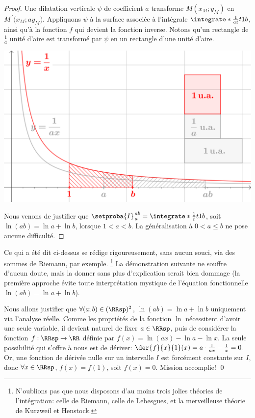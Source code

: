 \begin{proof}
    Une dilatation verticale $\psi$ de coefficient $a$ transforme $M(x_M ; y_M)$ en $M^{\,\prime}\big( x_M ; a y_M)$.
    Appliquons $\psi$ à la surface associée à l'intégrale $\integrate*{\frac{1}{at}}{t}{1}{b}$, ainsi qu'à la fonction $f$ qui devient la fonction inverse. Notons qu'un rectangle de $\frac1a$ unité d'aire est transformé par $\psi$ en un rectangle d'une unité d'aire.

    \begin{center}
        \includegraphics[scale=.5]{content/ln/func-eq-3.png}
    \end{center}

    Nous venons de justifier que
    $\setproba{I}_{\,a}^{\,ab} = \integrate*{\frac{1}{t}}{t}{1}{b}$,
    soit
    $\ln(a b) = \ln a + \ln b$,
    lorsque $1 < a < b$.
    La généralisation à $0 < a \leq b$ ne pose aucune difficulté.
\end{proof}


\begin{remark}
    Ce qui a été dit ci-dessus se rédige rigoureusement, sans aucun souci, via des sommes de Riemann, par exemple.%
    \footnote{
        N'oublions pas que nous disposons d'au moins trois jolies théories de l'intégration:
        celle de Riemann,
        celle de Lebesgues,
        et
        la merveilleuse théorie de Kurzweil et Henstock.
    }
    La démonstration suivante ne souffre d'aucun doute, mais la donner sans plus d'explication serait bien dommage (la première approche évite toute interprétation mystique de l'équation fonctionnelle $\ln(a b) = \ln a + \ln b$).
\end{remark}


{
\emph{\altproof{}}
    Nous allons justifier que
    $\forall (a;b) \in ( \RRsp )^2$,
    $\ln(a b) = \ln a + \ln b$
    uniquement via l'analyse réelle.
    Comme les propriétés de la fonction $\ln$ nécessitent d'avoir une seule variable,
    il devient naturel de fixer $a \in \RRsp$, puis de considérer la fonction
    $f: \RRsp \to \RR$
    définie par
    $f(x) = \ln(a x) - \ln a - \ln x$.
    La seule possibilité qui s'offre à nous est de dériver:
    $\der{f}{x}{1}(x) = a \cdot \frac{1}{a x} - \frac1x = 0$.
    Or,
    une fonction de dérivée nulle sur un intervalle $I$ est forcément constante sur $I$,
    donc
    $\forall x \in \RRsp$,
    $f(x) = f(1)$,
    soit
    $f(x) = 0$.
    Mission accomplie!
\qed
}



